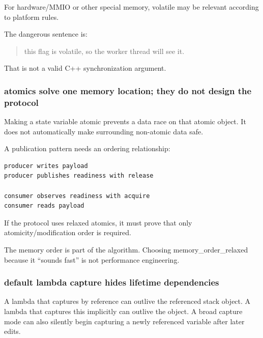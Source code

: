 For hardware/MMIO or other special memory, volatile may be relevant according to platform rules.

The dangerous sentence is:

\begin{quote}
this flag is volatile, so the worker thread will see it.
\end{quote}

That is not a valid C++ synchronization argument.

\subsubsection{atomics solve one memory location; they do not design the protocol}\label{01-foundations-i-ch005-atomics-solve-one-memory-location-they-do-not-design-the-protocol}

\hypertarget{01-foundations-i-ch005-atomics-solve-one-memory-location-they-do-not-design-the-protocol}{}

Making a state variable atomic prevents a data race on that atomic object. It does not automatically make surrounding non-atomic data safe.

A publication pattern needs an ordering relationship:

\begin{verbatim}
producer writes payload
producer publishes readiness with release

consumer observes readiness with acquire
consumer reads payload
\end{verbatim}

If the protocol uses relaxed atomics, it must prove that only atomicity/modification order is required.

The memory order is part of the algorithm. Choosing memory\_order\_relaxed because it ``sounds fast'' is not performance engineering.

\subsubsection{default lambda capture hides lifetime dependencies}\label{01-foundations-i-ch005-default-lambda-capture-hides-lifetime-dependencies}

\hypertarget{01-foundations-i-ch005-default-lambda-capture-hides-lifetime-dependencies}{}

A lambda that captures by reference can outlive the referenced stack object. A lambda that captures this implicitly can outlive the object. A broad capture mode can also silently begin capturing a newly referenced variable after later edits.

